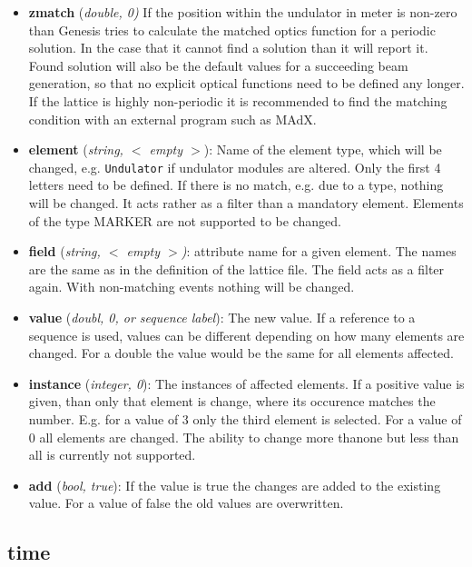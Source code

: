 \documentclass[12pt]{book}
\begin{document}
\begin{itemize}
\item {\bf zmatch} ({\it double, 0)} If the position within the undulator in meter is non-zero than Genesis tries to calculate the matched optics function for a periodic solution. In the case that it cannot find a solution than it will report it. Found solution will also be the default values for a succeeding beam generation, so that no explicit optical functions need to be defined any longer. If the lattice is highly non-periodic it is recommended to find the matching condition with an external program such as MAdX.
\item {\bf element} ({\it string, $<$ empty $>$}): Name of the element type, which will be changed, e.g. {\tt Undulator} if undulator modules are altered. Only the first 4 letters need to be defined. If there is no match, e.g. due to a type, nothing will be changed. It acts rather as a filter than a mandatory element. Elements of the type MARKER are not supported to be changed.
\item {\bf  field} ({\it string, $<$ empty $>$)}: attribute name for a given element. The names are the same as in the definition of the lattice file. The field acts as a filter again. With non-matching events nothing will be changed.
\item {\bf value} ({\it doubl, 0, or sequence label}): The new value. If a reference to a sequence is used, values can be different depending on how many elements are changed. For a double the value would be the same for all elements affected.
\item {\bf instance} ({\it integer, 0}): The instances of affected elements. If a positive value is given, than only that element is change, where its occurence matches the number. E.g. for a value of 3 only the third element is selected. For a value of 0 all elements are changed. The ability to change more thanone but less than all is currently not supported.
\item {\bf add} ({\it bool, true}): If the value is true the changes are added to the existing value. For a value of false the old values are overwritten.
\end{itemize}

\subsection{\sf time}
\end{document}
